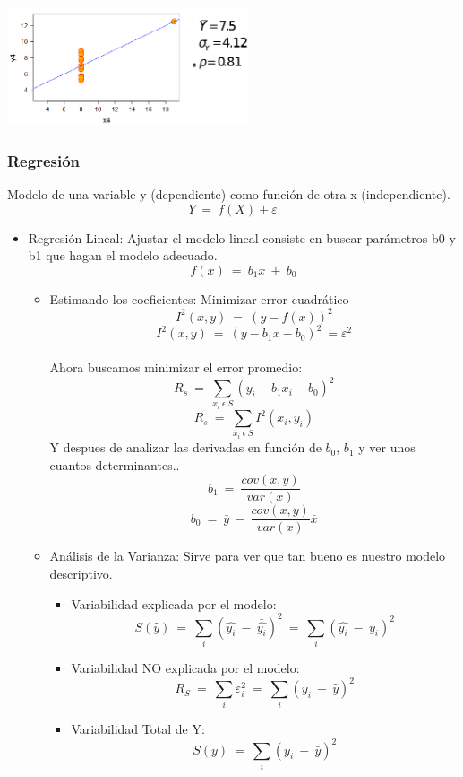 \begin{itemize}
\begin{itemize}
\begin{itemize}
					\includegraphics[height=3.5cm]{images/cap4-limit_pearson4.png}
			\end{itemize}
		\end{itemize}
		\subsubsection{Regresi\'on}
			Modelo de una variable y (dependiente) como funci\'on de otra x (independiente).\\
			$$Y\ =\ f(X)+\varepsilon$$
		\begin{itemize}
			\item Regresi\'on Lineal: Ajustar el modelo lineal consiste en buscar par\'ametros b0 y b1 que hagan el modelo adecuado.
				$$f(x)\ =\ b_1x\ +\ b_0$$
			\begin{itemize}
				\item Estimando los coeficientes: Minimizar error cuadr\'atico\\
					$$I^2(x,y)\ =\ (y-f(x))^2$$
					$$I^2(x,y)\ =\ (y-b_1x-b_0)^2\ = \varepsilon^2$$\\
					Ahora buscamos minimizar el error promedio:\\
					$$R_s\ =\ \sum_{x_i\ \epsilon\ S}(y_i-b_1x_i-b_0)^2$$
					$$R_s\ =\ \sum_{x_i\ \epsilon\ S}I^2(x_i,y_i)$$
					Y despues de analizar las derivadas en funci\'on de $b_0$, $b_1$ y ver unos cuantos determinantes..
					$$b_1\ =\ \frac{cov(x,y)}{var(x)}$$
					$$b_0\ =\ \bar{y}\ -\ \frac{cov(x,y)}{var(x)}\bar{x}$$
				\item An\'alisis de la Varianza: Sirve para ver que tan bueno es nuestro modelo descriptivo.\\
				\begin{itemize}
					\item Variabilidad explicada por el modelo: $$S(\hat{y})\ =\ \sum_{i}(\hat{y_i}\ -\ \bar{\hat{y_i}})^2\ =\ \sum_{i}(\hat{y_i}\ -\ \bar{y_i})^2$$
					\item Variabilidad NO explicada por el modelo:$$R_S\ =\ \sum_{i}\varepsilon_{i}^{2}\ =\ \sum_{i}(y_i\ -\ \hat{y})^2$$
					\item Variabilidad Total de Y:
								$$S(y)\ =\ \sum_{i}(y_i\ -\ \bar{y})^2$$\\

\end{itemize}
\end{itemize}
\end{itemize}
\end{itemize}
